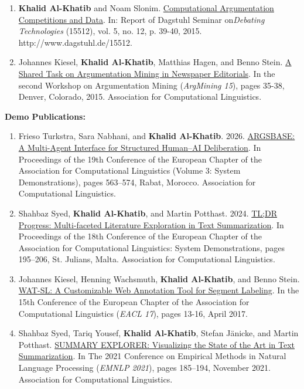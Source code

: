 \begin{enumerate}
\item {\textbf{Khalid Al-Khatib} and Noam Slonim. \href{https://drops.dagstuhl.de/storage/04dagstuhl-reports/volume05/issue12/15512/DagRep.5.12.18/DagRep.5.12.18.pdf#page=22}{Computational Argumentation Competitions and Data}. In: Report of Dagstuhl Seminar on\textit{Debating Technologies} (15512), vol. 5, no. 12, p. 39-40, 2015. http://www.dagstuhl.de/15512. }
\item {Johannes Kiesel, \textbf{Khalid Al-Khatib}, Matthias Hagen, and Benno Stein. \href{https://aclanthology.org/W15-0505/}{A Shared Task on Argumentation Mining in Newspaper Editorials}. In the second Workshop on Argumentation Mining (\textit{ArgMining 15}), pages 35-38, Denver, Colorado, 2015. Association for Computational Linguistics.}
\end{enumerate}



\textbf{Demo Publications:}

\begin{enumerate}

\item Frieso Turkstra, Sara Nabhani, and \textbf{Khalid Al-Khatib}. 2026. \href{https://aclanthology.org/2026.eacl-demo.39/}{ARGSBASE: A Multi-Agent Interface for Structured Human--AI Deliberation}. In Proceedings of the 19th Conference of the European Chapter of the Association for Computational Linguistics (Volume 3: System Demonstrations), pages 563--574, Rabat, Morocco. Association for Computational Linguistics.
\item {Shahbaz Syed, \textbf{Khalid Al-Khatib}, and Martin Potthast. 2024. \href{https://aclanthology.org/2024.eacl-demo.21/}{TL;DR Progress: Multi-faceted Literature Exploration in Text Summarization}. In Proceedings of the 18th Conference of the European Chapter of the Association for Computational Linguistics: System Demonstrations, pages 195--206, St. Julians, Malta. Association for Computational Linguistics.}

\item {Johannes Kiesel, Henning Wachsmuth, \textbf{Khalid Al-Khatib}, and Benno Stein. \href{https://aclanthology.org/E17-3004/}{WAT-SL: A Customizable Web Annotation Tool for Segment Labeling}. In the 15th Conference of the European Chapter of the Association for Computational Linguistics (\textit{EACL 17}), pages 13-16, April 2017.}

\item {Shahbaz Syed, Tariq Yousef, \textbf{Khalid Al-Khatib}, Stefan Jänicke, and Martin Potthast. \href{https://aclanthology.org/2021.emnlp-demo.22/}{SUMMARY EXPLORER: Visualizing the State of the Art in Text Summarization}. In The 2021 Conference on Empirical Methods in Natural Language Processing (\textit{EMNLP 2021}), pages 185–194, November 2021. Association for Computational Linguistics.}
\end{enumerate}

